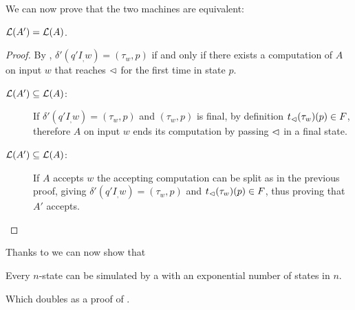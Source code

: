 We can now prove that the two machines are equivalent:
\begin{thrm}\label{thm:transtab2DFA}
	$\mathcal L(A')=\mathcal L(A)$.
\end{thrm}
\begin{proof}
	By , $\delta'(q'I_,w)=(\tau_w,p)$ if and only if there exists a computation of $A$ on input $w$ that reaches $\lhd$ for the first time in state $p$.
	\begin{description}
		\item[$\mathcal L(A')\subseteq\mathcal L(A)$:] If $\delta'(q'I_,w)=(\tau_w,p)$ and $(\tau_w,p)$ is final, by definition $t_\lhd(\tau_w)(p)\in F$, therefore $A$ on input $w$ ends its computation by passing $\lhd$ in a final state.
		\item[$\mathcal L(A')\subseteq\mathcal L(A)$:] If $A$ accepts $w$ the accepting computation can be split as in the previous proof, giving $\delta'(q'I_,w)=(\tau_w,p)$ and $t_\lhd(\tau_w)(p)\in F$, thus proving that $A'$ accepts.
	\end{description}
\end{proof}

Thanks to  we can now show that
\begin{thrm}
	Every $n$-state \TDFA can be simulated by a \ODFA with an exponential number of states in $n$.
\end{thrm}
Which doubles as a proof of .
